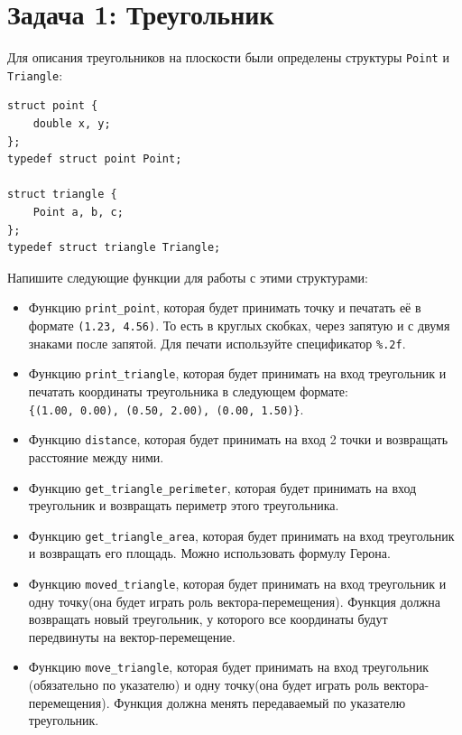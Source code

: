 \documentclass{article}
\begin{document}
\newpage
\section*{Задача 1: Треугольник}
Для описания треугольников на плоскости были определены структуры \texttt{Point} и \texttt{Triangle}:
\begin{lstlisting}
struct point {
    double x, y;
};
typedef struct point Point;

struct triangle {
    Point a, b, c;
};
typedef struct triangle Triangle;
\end{lstlisting}
Напишите следующие функции для работы с этими структурами:
\begin{itemize}
\item Функцию \texttt{print\_point}, которая будет принимать точку и печатать её в формате \texttt{(1.23, 4.56)}. То есть в круглых скобках, через запятую и с двумя знаками после запятой. Для печати используйте спецификатор \texttt{\%.2f}.

\item Функцию \texttt{print\_triangle}, которая будет принимать на вход треугольник и печатать координаты треугольника в следующем формате: \\
\texttt{\{(1.00, 0.00), (0.50, 2.00), (0.00, 1.50)\}}.

\item Функцию \texttt{distance}, которая будет принимать на вход 2 точки и возвращать расстояние между ними.

\item Функцию \texttt{get\_triangle\_perimeter}, которая будет принимать на вход треугольник и возвращать периметр этого треугольника.

\item Функцию \texttt{get\_triangle\_area}, которая будет принимать на вход треугольник и возвращать его площадь. Можно использовать формулу Герона.

\item Функцию \texttt{moved\_triangle}, которая будет принимать на вход треугольник и одну точку(она будет играть роль вектора-перемещения). Функция должна возвращать новый треугольник, у которого все координаты будут передвинуты на вектор-перемещение.

\item Функцию \texttt{move\_triangle}, которая будет принимать на вход треугольник (обязательно по указателю) и одну точку(она будет играть роль вектора-перемещения). Функция должна менять передаваемый по указателю треугольник.


\end{itemize}
\end{document}
